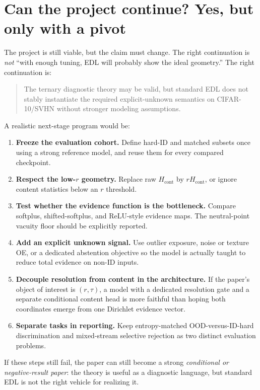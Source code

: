 \documentclass[11pt]{article}
\begin{document}
\section{Can the project continue? Yes, but only with a pivot}

The project is still viable, but the claim must change. The right continuation is \emph{not} ``with enough tuning, EDL will probably show the ideal geometry.'' The right continuation is:

\begin{quote}
The ternary diagnostic theory may be valid, but standard EDL does not stably instantiate the required explicit-unknown semantics on CIFAR-10/SVHN without stronger modeling assumptions.
\end{quote}

A realistic next-stage program would be:

\begin{enumerate}[leftmargin=1.5em]
  \item \textbf{Freeze the evaluation cohort.} Define hard-ID and matched subsets once using a strong reference model, and reuse them for every compared checkpoint.
  \item \textbf{Respect the low-$r$ geometry.} Replace raw $H_{\mathrm{cont}}$ by $rH_{\mathrm{cont}}$, or ignore content statistics below an $r$ threshold.
  \item \textbf{Test whether the evidence function is the bottleneck.} Compare softplus, shifted-softplus, and ReLU-style evidence maps. The neutral-point vacuity floor should be explicitly reported.
  \item \textbf{Add an explicit unknown signal.} Use outlier exposure, noise or texture OE, or a dedicated abstention objective so the model is actually taught to reduce total evidence on non-ID inputs.
  \item \textbf{Decouple resolution from content in the architecture.} If the paper's object of interest is $(r,\tau)$, a model with a dedicated resolution gate and a separate conditional content head is more faithful than hoping both coordinates emerge from one Dirichlet evidence vector.
  \item \textbf{Separate tasks in reporting.} Keep entropy-matched OOD-versus-ID-hard discrimination and mixed-stream selective rejection as two distinct evaluation problems.
\end{enumerate}

If these steps still fail, the paper can still become a strong \emph{conditional or negative-result paper}: the theory is useful as a diagnostic language, but standard EDL is not the right vehicle for realizing it.
\end{document}
